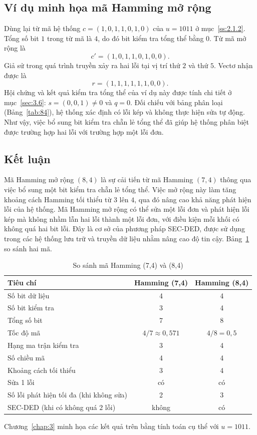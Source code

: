 \subsection{Ví dụ minh họa mã Hamming mở rộng}
\label{ss:2.7.4}

Dùng lại từ mã hệ thống $c = (1,0,1,1,0,1,0)$ của $u = 1011$ ở
mục~\ref{ss:2.1.2}. Tổng số bit $1$ trong từ mã là $4$, do đó bit kiểm tra tổng
thể bằng $0$. Từ mã mở rộng là
\[
  c' = (1,0,1,1,0,1,0,0) .
\]
Giả sử trong quá trình truyền xảy ra hai lỗi tại vị trí thứ $2$ và thứ $5$. Vectơ
nhận được là
\[
  r = (1,1,1,1,1,1,0,0) .
\]
Hội chứng và kết quả kiểm tra tổng thể của ví dụ này được tính chi tiết ở
mục~\ref{sec:3.6}: $s = (0,0,1) \neq 0$ và $q = 0$. Đối chiếu với bảng phân
loại (Bảng~\ref{tab:84}), hệ thống xác định có lỗi kép và không thực hiện sửa
tự động. Như vậy, việc bổ
sung bit kiểm tra chẵn lẻ tổng thể đã giúp hệ thống phân biệt được trường hợp
hai lỗi với trường hợp một lỗi đơn.

\subsection{Kết luận}
\label{ss:2.7.5}

Mã Hamming mở rộng $(8,4)$ là sự cải tiến từ mã Hamming $(7,4)$ thông qua việc
bổ sung một bit kiểm tra chẵn lẻ tổng thể. Việc mở rộng này làm tăng khoảng
cách Hamming tối thiểu từ $3$ lên $4$, qua đó nâng cao khả năng phát hiện lỗi của
hệ thống. Mã Hamming mở rộng có thể sửa một lỗi đơn và phát hiện lỗi kép mà
không nhầm lẫn hai lỗi thành một lỗi đơn, với điều kiện mỗi khối có không quá
hai bit lỗi. Đây là
cơ sở của phương pháp SEC-DED, được sử dụng trong các hệ thống lưu trữ và truyền
dữ liệu nhằm nâng cao độ tin cậy. Bảng~\ref{tab:sosanh} so sánh hai mã.

\begin{table}[H]
\centering\small\renewcommand{\arraystretch}{1.1}
\caption{So sánh mã Hamming (7,4) và (8,4)}
\label{tab:sosanh}
\begin{tabular}{|l|c|c|}
\hline
\textbf{Tiêu chí} & \textbf{Hamming (7,4)} & \textbf{Hamming (8,4)}\\ \hline
Số bit dữ liệu & 4 & 4\\ \hline
Số bit kiểm tra & 3 & 4\\ \hline
Tổng số bit & 7 & 8\\ \hline
Tốc độ mã & $4/7 \approx 0{,}571$ & $4/8 = 0{,}5$\\ \hline
Hạng ma trận kiểm tra & 3 & 4\\ \hline
Số chiều mã & 4 & 4\\ \hline
Khoảng cách tối thiểu & 3 & 4\\ \hline
Sửa 1 lỗi & có & có\\ \hline
Số lỗi phát hiện tối đa (khi không sửa) & 2 & 3\\ \hline
SEC-DED (khi có không quá $2$ lỗi) & không & có\\ \hline
\end{tabular}
\end{table}

Chương~\ref{chap:3} minh họa các kết quả trên bằng tính toán cụ thể với
$u = 1011$.
